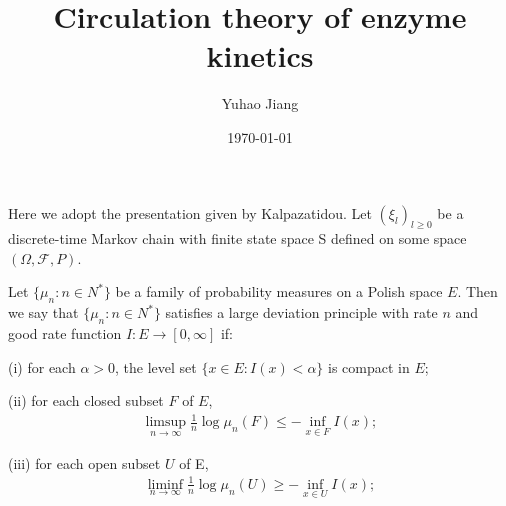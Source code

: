 \documentclass[11pt,en,cite=authoryear]{elegantpaper}
\title{Circulation theory of enzyme kinetics}
\author{Yuhao Jiang}
\date{\today}
\begin{document}
\maketitle

Here we adopt the presentation given by Kalpazatidou.
Let $(\xi_l)_{l\ge 0}$ be a discrete-time Markov chain with finite state space S defined on some space $(\Omega, \mathcal{F}, P)$. \\






\begin{definition}
    Let $\{\mu_n: n \in N^*\}$ be a family of probability measures on a Polish
    space $E$. Then we say that $\{\mu_n: n \in N^*\}$ satisfies a large deviation principle with rate $n$ and good rate function $I: E \rightarrow [0, \infty]$ if: 

    (i) for each $\alpha >0$, the level set $\{x\in E: I(x)<\alpha\}$ is compact in $E$;

    (ii) for each closed subset $F$ of $E$,
    \begin{align}
        \limsup_{n \rightarrow \infty} \frac{1}{n} \log \mu_n(F) \leq -\inf_{x\in F} I(x);
    \end{align}

    (iii) for each open subset $U$ of E,
    \begin{align}
        \liminf_{n \rightarrow \infty} \frac{1}{n} \log \mu_n(U) \geq -\inf_{x\in U} I(x);
    \end{align}
\end{definition}
\end{document}
